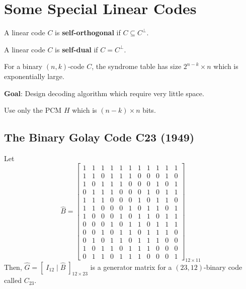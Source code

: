 \chapter{Some Special Linear Codes}
\begin{defbox}
    \begin{definition}
        A linear code $ C $ is \textbf{self-orthogonal} if $ C\subseteq C^{\perp} $.
    \end{definition}
\end{defbox}
\begin{defbox}
    \begin{definition}
        A linear code $ C $ is \textbf{self-dual} if $ C=C^{\perp} $.
    \end{definition}
\end{defbox}
For a binary $ (n,k) $-code $ C $, the syndrome table has
size $ 2^{n-k}\times n $ which is exponentially large.

\textbf{Goal}: Design decoding algorithm which require
very little space.

\begin{exbox}
    \begin{example}
        Use only the PCM $ H $ which is $ (n-k)\times n $ bits.
    \end{example}
\end{exbox}

\section{The Binary Golay Code C23 (1949)}
Let
\[
    \hat{B}=
    \left[
        \begin{array}{cccccccccccc}
            1 & 1 & 1 & 1 & 1 & 1 & 1 & 1 & 1 & 1 & 1 \\
            1 & 1 & 0 & 1 & 1 & 1 & 0 & 0 & 0 & 1 & 0 \\
            1 & 0 & 1 & 1 & 1 & 0 & 0 & 0 & 1 & 0 & 1 \\
            0 & 1 & 1 & 1 & 0 & 0 & 0 & 1 & 0 & 1 & 1 \\
            1 & 1 & 1 & 0 & 0 & 0 & 1 & 0 & 1 & 1 & 0 \\
            1 & 1 & 0 & 0 & 0 & 1 & 0 & 1 & 1 & 0 & 1 \\
            1 & 0 & 0 & 0 & 1 & 0 & 1 & 1 & 0 & 1 & 1 \\
            0 & 0 & 0 & 1 & 0 & 1 & 1 & 0 & 1 & 1 & 1 \\
            0 & 0 & 1 & 0 & 1 & 1 & 0 & 1 & 1 & 1 & 0 \\
            0 & 1 & 0 & 1 & 1 & 0 & 1 & 1 & 1 & 0 & 0 \\
            1 & 0 & 1 & 1 & 0 & 1 & 1 & 1 & 0 & 0 & 0 \\
            0 & 1 & 1 & 0 & 1 & 1 & 1 & 0 & 0 & 0 & 1
        \end{array}
        \right]_{12\times{} 11} \]
Then, $ \hat{G}=\left[\; I_{12}\mid \hat{B}\; \right]_{12\times 23} $
is a generator matrix for a $ (23,12) $-binary code called $ C_{23} $.

